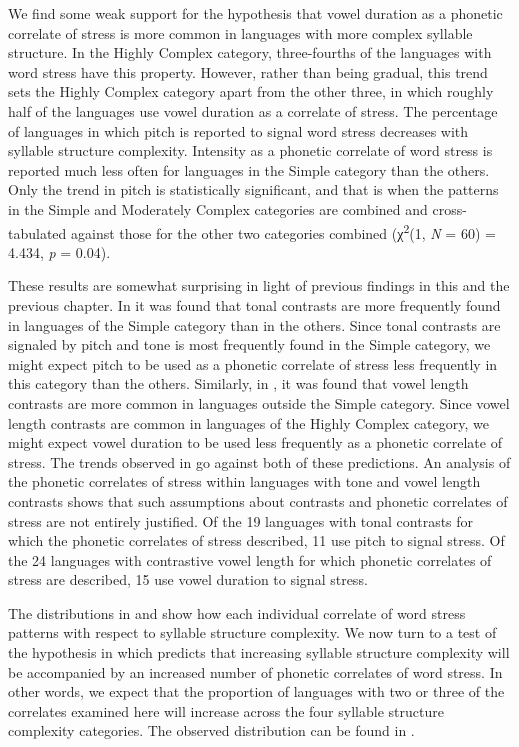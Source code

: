   We find some weak support for the hypothesis that vowel duration as a phonetic correlate of stress is more common in languages with more complex syllable structure. In the Highly Complex category, three-fourths of the languages with word stress have this property. However, rather than being gradual, this trend sets the Highly Complex category apart from the other three, in which roughly half of the languages use vowel duration as a correlate of stress. The percentage of languages in which pitch is reported to signal word stress decreases with syllable structure complexity. Intensity as a phonetic correlate of word stress is reported much less often for languages in the Simple category than the others. Only the trend in pitch is statistically significant, and that is when the patterns in the Simple and Moderately Complex categories are combined and cross-tabulated against those for the other two categories combined (χ\textsuperscript{2}(1, \textit{N} = 60) = 4.434, \textit{p} = 0.04).

  These results are somewhat surprising in light of previous findings in this and the previous chapter. In  it was found that tonal contrasts are more frequently found in languages of the Simple category than in the others. Since tonal contrasts are signaled by pitch and tone is most frequently found in the Simple category, we might expect pitch to be used as a phonetic correlate of stress less frequently in this category than the others. Similarly, in , it was found that vowel length contrasts are more common in languages outside the Simple category. Since vowel length contrasts are common in languages of the Highly Complex category, we might expect vowel duration to be used less frequently as a phonetic correlate of stress. The trends observed in  go against both of these predictions. An analysis of the phonetic correlates of stress within languages with tone and vowel length contrasts shows that such assumptions about contrasts and phonetic correlates of stress are not entirely justified. Of the 19 languages with tonal contrasts for which the phonetic correlates of stress described, 11 use pitch to signal stress. Of the 24 languages with contrastive vowel length for which phonetic correlates of stress are described, 15 use vowel duration to signal stress. 

  The distributions in  and  show how each individual correlate of word stress patterns with respect to syllable structure complexity. We now turn to a test of the hypothesis in  which predicts that increasing syllable structure complexity will be accompanied by an increased number of phonetic correlates of word stress. In other words, we expect that the proportion of languages with two or three of the correlates examined here will increase across the four syllable structure complexity categories. The observed distribution can be found in .

